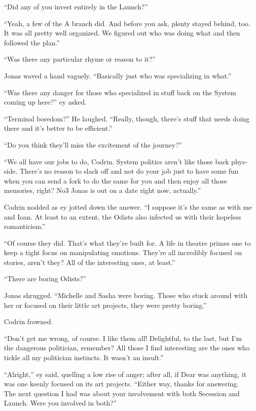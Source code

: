 ``Did any of you invest entirely in the Launch?''

``Yeah, a few of the A branch did. And before you ask, plenty stayed behind, too. It was all pretty well organized. We figured out who was doing what and then followed the plan.''

``Was there any particular rhyme or reason to it?''

Jonas waved a hand vaguely. ``Basically just who was specializing in what.''

``Was there any danger for those who specialized in stuff back on the System coming up here?'' ey asked.

``Terminal boredom?'' He laughed. ``Really, though, there's stuff that needs doing there and it's better to be efficient.''

``Do you think they'll miss the excitement of the journey?''

``We all have our jobs to do, Codrin. System politics aren't like those back phys-side. There's no reason to slack off and not do your job just to have some fun when you can send a fork to do the same for you and then enjoy all those memories, right? No3 Jonas is out on a date right now, actually.''

Codrin nodded as ey jotted down the answer. ``I suppose it's the same as with me and Ioan. At least to an extent, the Odists also infected us with their hopeless romanticism.''

``Of course they did. That's what they're built for. A life in theatre primes one to keep a tight focus on manipulating emotions. They're all incredibly focused on stories, aren't they? All of the interesting ones, at least.''

``There are boring Odists?''

Jonas shrugged. ``Michelle and Sasha were boring. Those who stuck around with her or focused on their little art projects, they were pretty boring.''

Codrin frowned.

``Don't get me wrong, of course. I like them all! Delightful, to the last, but I'm the dangerous politician, remember? All those I find interesting are the ones who tickle all my politician instincts. It wasn't an insult.''

``Alright,'' ey said, quelling a low rise of anger; after all, if Dear was anything, it was one keenly focused on its art projects. ``Either way, thanks for answering. The next question I had was about your involvement with both Secession and Launch. Were you involved in both?''

